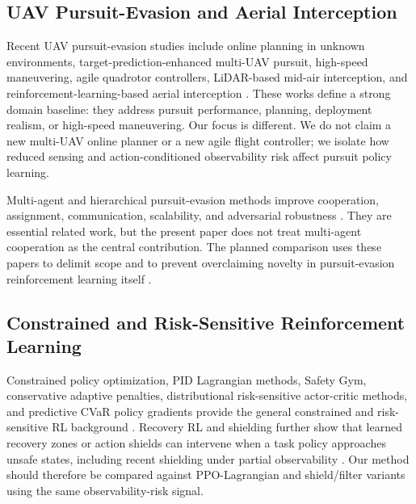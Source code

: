 \documentclass[lettersize,journal]{IEEEtran}
\begin{document}
\subsection{UAV Pursuit-Evasion and Aerial Interception}

Recent UAV pursuit-evasion studies include online planning in unknown environments, target-prediction-enhanced multi-UAV pursuit, high-speed maneuvering, agile quadrotor controllers, LiDAR-based mid-air interception, and reinforcement-learning-based aerial interception \cite{chen2025open,zhang2023gameofdrones,yan2024lsrctd3,roncero2025agilecontrollers,pliska2024safeinterception,giral2026intercept,zhao2025msmar}. These works define a strong domain baseline: they address pursuit performance, planning, deployment realism, or high-speed maneuvering. Our focus is different. We do not claim a new multi-UAV online planner or a new agile flight controller; we isolate how reduced sensing and action-conditioned observability risk affect pursuit policy learning.

Multi-agent and hierarchical pursuit-evasion methods improve cooperation, assignment, communication, scalability, and adversarial robustness \cite{shao2026peqmixer,zhao2024autonomousuavpe,luo2024improvedmadrl,tan2026scalablefixedwing,xiang2025cihrl,feroskhan2024multipursuitevasion}. They are essential related work, but the present paper does not treat multi-agent cooperation as the central contribution. The planned comparison uses these papers to delimit scope and to prevent overclaiming novelty in pursuit-evasion reinforcement learning itself \cite{yang2025rlpereview}.

\subsection{Constrained and Risk-Sensitive Reinforcement Learning}

Constrained policy optimization, PID Lagrangian methods, Safety Gym, conservative adaptive penalties, distributional risk-sensitive actor-critic methods, and predictive CVaR policy gradients provide the general constrained and risk-sensitive RL background \cite{achiam2017cpo,stooke2020pidlag,safetygym2019,ma2022cap,ma2020dsac,kim2024predictivecvar}. Recovery RL and shielding further show that learned recovery zones or action shields can intervene when a task policy approaches unsafe states, including recent shielding under partial observability \cite{thananjeyan2021recoveryrl,alshiekh2018shielding,carr2023shieldingpobs}. Our method should therefore be compared against PPO-Lagrangian and shield/filter variants using the same observability-risk signal.
\end{document}
